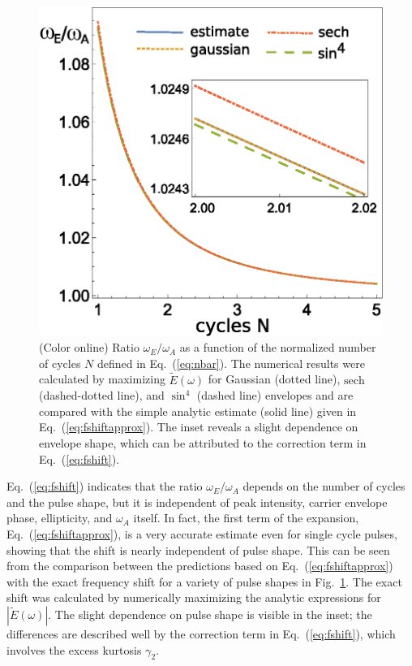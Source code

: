\begin{figure}[t]
\centering
    \includegraphics[width=0.8\linewidth]{figs/Frequency_shift/fshift51.eps}
\caption{(Color online)
Ratio $\omega_E/\omega_A$ as a function of the normalized number of cycles $ N$ defined in Eq.~(\ref{eq:nbar}). The numerical results were calculated by maximizing $\tilde{E}(\omega)$ for Gaussian (dotted line), $\text{sech}$ (dashed-dotted line), and $\sin^4$ (dashed line) envelopes and are compared with the simple analytic estimate (solid line) given in Eq.~(\ref{eq:fshiftapprox}). The inset reveals a slight dependence on envelope shape, which can be attributed to the correction term in Eq.~(\ref{eq:fshift}).
}
  \label{fig:shift}
\end{figure}

Eq.~(\ref{eq:fshift}) indicates that the ratio $\omega_E/\omega_A$ depends on the number of cycles and the pulse shape, but it is independent of peak intensity, carrier envelope phase, ellipticity, and $\omega_A$ itself. In fact, the first term of the expansion, Eq.~(\ref{eq:fshiftapprox}), is a very accurate estimate even for single cycle pulses, showing that the shift is nearly independent of pulse shape. This can be seen from the comparison between the predictions based on Eq.~(\ref{eq:fshiftapprox}) with the exact frequency shift for a variety of pulse shapes in Fig.~\ref{fig:shift}. The exact shift was calculated by numerically maximizing the analytic expressions for $|\tilde{E}(\omega)|$. The slight dependence on pulse shape is visible in the inset; the differences are described well by the correction term in Eq.~(\ref{eq:fshift}), which involves the excess kurtosis $\gamma_2$.

